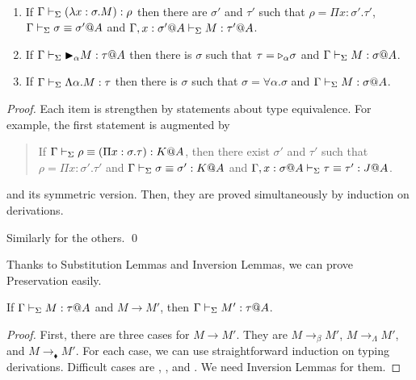 \begin{lemma}[Inversion]\ 
	\begin{enumerate}
		\item If $\Gamma \vdash_\Sigma (\lambda x:\sigma.M) : \rho$ then there are $\sigma'$ and $\tau'$ such that
		      $\rho = \Pi x:\sigma'.\tau'$, $\Gamma \vdash_\Sigma \sigma \equiv \sigma'@A$ and $\Gamma ,x:\sigma'@A\vdash_\Sigma M:\tau'@A$.
		\item If $\G \V \TB_\alpha M : \tau@A$ then 
		      there is $\sigma$ such that $\tau = {\mathop{\triangleright}}_\alpha \sigma$ and $\G \V M : \sigma@A$.
		  \item If $\Gamma \vdash_\Sigma \Lambda\alpha.M : \tau$ then 
		  there is $\sigma$ such that $\sigma = \forall\alpha.\sigma$ and $\G \V M : \sigma@A$.%
	\end{enumerate}
\end{lemma}

\begin{proof}
  Each item is strengthen by statements about type equivalence.
  For example, the first statement is augmented by
  \begin{quotation}
    If $\Gamma \vdash_\Sigma \rho \equiv (\Pi x:\sigma.\tau) : K @A$, then there exist
    $\sigma'$ and $\tau'$ such that $\rho = \Pi x:\sigma'.\tau'$ and
    $\Gamma \vdash_\Sigma \sigma \equiv \sigma' : K @A$ and
    $\G, x:\sigma@A\V \tau \E \tau' : J @A$.
  \end{quotation}
  and its symmetric version.  Then, they are proved simultaneously by induction on derivations.

  Similarly for the others.
 \qed
\end{proof}



Thanks to Substitution Lemmas and Inversion Lemmas, we can prove Preservation easily.

\begin{theorem}[Preservation]
	If $\Gamma\vdash_\Sigma M:\tau @A$ and $M \longrightarrow M'$, then $\Gamma\vdash_\Sigma M':\tau @A$.
\end{theorem}

\begin{proof}
	First, there are three cases for $M \longrightarrow M'$.
	They are $M \longrightarrow_\beta M'$, $M \longrightarrow_\Lambda M'$, and $M \longrightarrow_\blacklozenge M'$.
	For each case, we can use straightforward induction on typing derivations.
	Difficult cases are \TApp, \TTBL, and \TIns.
	We need Inversion Lemmas for them.
\end{proof}


